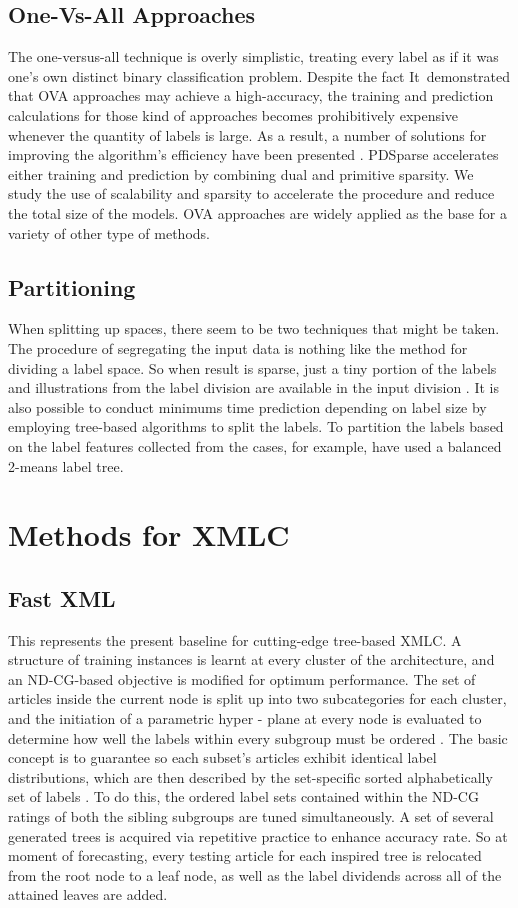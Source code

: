 \documentclass[a4paper]{article}
\begin{document}
\subsection{One-Vs-All Approaches}
The one-versus-all technique is overly simplistic, treating every label as if it was one's own distinct binary classification problem. Despite the fact It demonstrated that OVA approaches may achieve a high-accuracy, the training and prediction calculations for those kind of approaches becomes prohibitively expensive whenever the quantity of labels is large. As a result, a number of solutions for improving the algorithm's efficiency have been presented \cite{bib5}. PDSparse accelerates either training and prediction by combining dual and primitive sparsity. We study the use of scalability and sparsity to accelerate the procedure and reduce the total size of the models. OVA approaches are widely applied as the base for a variety of other type of methods.

\subsection{Partitioning}
When splitting up spaces, there seem to be two techniques that might be taken. The procedure of segregating the input data is nothing like the method for dividing a label space. So when result is sparse, just a tiny portion of the labels and illustrations from the label division are available in the input division \cite{bib7}. It is also possible to conduct minimums time prediction depending on label size by employing tree-based algorithms to split the labels. To partition the labels based on the label features collected from the cases, for example, have used a balanced 2-means label tree.

\section{Methods for XMLC}

\subsection{Fast XML}
This represents the present baseline for cutting-edge tree-based XMLC. A structure of training instances is learnt at every cluster of the architecture, and an ND-CG-based objective is modified for optimum performance. The set of articles inside the current node is split up into two subcategories for each cluster, and the initiation of a parametric hyper - plane at every node is evaluated to determine how well the labels within every subgroup must be ordered \cite{bib7}. The basic concept is to guarantee so each subset's articles exhibit identical label distributions, which are then described by the set-specific sorted alphabetically set of labels \cite{bib4}. To do this, the ordered label sets contained within the ND-CG ratings of both the sibling subgroups are tuned simultaneously. A set of several generated trees is acquired via repetitive practice to enhance accuracy rate. So at moment of forecasting, every testing article for each inspired tree is relocated from the root node to a leaf node, as well as the label dividends across all of the attained leaves are added.
\end{document}
